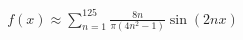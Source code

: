 \documentclass[preview]{standalone}
\begin{document}
\begin{align*}
f(x) \approx \sum_{n=1}^{125} \frac{8n}{\pi(4n^2-1)} \sin(2nx)
\end{align*}
\end{document}
